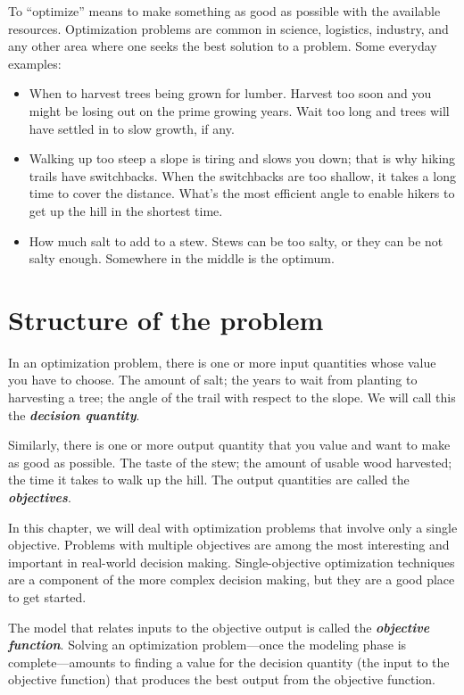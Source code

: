 \documentclass[
  letterpaper,
  DIV=11,
  numbers=noendperiod,
  oneside]{scrreprt}
\providecommand{\tightlist}{%
  \setlength{\itemsep}{0pt}\setlength{\parskip}{0pt}}
\begin{document}
To ``optimize'' means to make something as good as possible with the
available resources. Optimization problems are common in science,
logistics, industry, and any other area where one seeks the best
solution to a problem. Some everyday examples:

\begin{itemize}
\tightlist
\item
  When to harvest trees being grown for lumber. Harvest too soon and you
  might be losing out on the prime growing years. Wait too long and
  trees will have settled in to slow growth, if any.
\item
  Walking up too steep a slope is tiring and slows you down; that is why
  hiking trails have switchbacks. When the switchbacks are too shallow,
  it takes a long time to cover the distance. What's the most efficient
  angle to enable hikers to get up the hill in the shortest time.
\item
  How much salt to add to a stew. Stews can be too salty, or they can be
  not salty enough. Somewhere in the middle is the optimum.
\end{itemize}

\hypertarget{structure-of-the-problem}{%
\section{Structure of the problem}\label{structure-of-the-problem}}

In an optimization problem, there is one or more input quantities whose
value you have to choose. The amount of salt; the years to wait from
planting to harvesting a tree; the angle of the trail with respect to
the slope. We will call this the \textbf{\emph{decision quantity}}.

Similarly, there is one or more output quantity that you value and want
to make as good as possible. The taste of the stew; the amount of usable
wood harvested; the time it takes to walk up the hill. The output
quantities are called the \textbf{\emph{objectives}}.

In this chapter, we will deal with optimization problems that involve
only a single objective. Problems with multiple objectives are among the
most interesting and important in real-world decision making.
Single-objective optimization techniques are a component of the more
complex decision making, but they are a good place to get started.

The model that relates inputs to the objective output is called the
\textbf{\emph{objective function}}. Solving an optimization
problem---once the modeling phase is complete---amounts to finding a
value for the decision quantity (the input to the objective function)
that produces the best output from the objective function.
\end{document}
